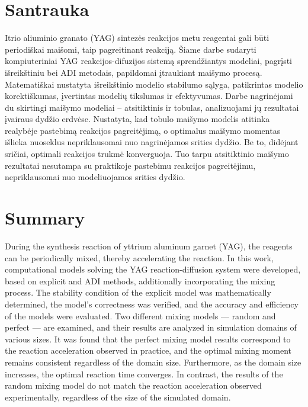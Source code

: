 \section*{Santrauka}

Itrio aliuminio granato (YAG) sintezės reakcijos metu reagentai gali būti periodiškai maišomi, taip pagreitinant reakciją. Šiame darbe sudaryti kompiuteriniai YAG reakcijos-difuzijos sistemą sprendžiantys modeliai, pagrįsti išreikštiniu bei ADI metodais, papildomai įtraukiant maišymo procesą. Matematiškai nustatyta išreikštinio modelio stabilumo sąlyga, patikrintas modelio korektiškumas, įvertintas modelių tikslumas ir efektyvumas. Darbe nagrinėjami du skirtingi maišymo modeliai -- atsitiktinis ir tobulas, analizuojami jų rezultatai įvairaus dydžio erdvėse. Nustatyta, kad tobulo maišymo modelis atitinka realybėje pastebimą reakcijos pagreitėjimą, o optimalus maišymo momentas išlieka nuoseklus nepriklausomai nuo nagrinėjamos srities dydžio. Be to, didėjant sričiai, optimali reakcijos trukmė konverguoja. Tuo tarpu atsitiktinio maišymo rezultatai nesutampa su praktikoje pastebimu reakcijos pagreitėjimu, nepriklausomai nuo modeliuojamos srities dydžio.

\newpage 

\section*{Summary}

During the synthesis reaction of yttrium aluminum garnet (YAG), the reagents can be periodically mixed, thereby accelerating the reaction. In this work, computational models solving the YAG reaction-diffusion system were developed, based on explicit and ADI methods, additionally incorporating the mixing process. The stability condition of the explicit model was mathematically determined, the model's correctness was verified, and the accuracy and efficiency of the models were evaluated. Two different mixing models — random and perfect — are examined, and their results are analyzed in simulation domains of various sizes. It was found that the perfect mixing model results correspond to the reaction acceleration observed in practice, and the optimal mixing moment remains consistent regardless of the domain size. Furthermore, as the domain size increases, the optimal reaction time converges. In contrast, the results of the random mixing model do not match the reaction acceleration observed experimentally, regardless of the size of the simulated domain.

\newpage 